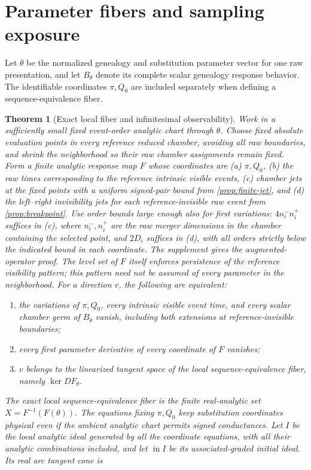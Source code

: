 \documentclass[11pt]{article}
\newtheorem{theorem}{Theorem}[section]
\begin{document}
\section{Parameter fibers and sampling exposure}
\label{sec:fibers}

Let $\theta$ be the normalized genealogy and substitution parameter vector for one raw presentation, and let $B_\theta$ denote its complete scalar genealogy response behavior.  The identifiable coordinates $\pi,Q_0$ are included separately when defining a sequence-equivalence fiber.

\begin{theorem}[Exact local fiber and infinitesimal observability]
\label{thm:parameter-fiber}
Work in a sufficiently small fixed event-order analytic chart through $\theta$.  Choose fixed absolute evaluation points in every reference reduced chamber, avoiding all raw boundaries, and shrink the neighborhood so their raw chamber assignments remain fixed.  Form a finite analytic response map $F$ whose coordinates are (a) $\pi,Q_0$, (b) the raw times corresponding to the reference intrinsic visible events, (c) chamber jets at the fixed points with a uniform signed-pair bound from \cref{prop:finite-jet}, and (d) the left--right invisibility jets for each reference-invisible raw event from \cref{prop:breakpoint}.  Use order bounds large enough also for first variations: $4n_i^-n_i^+$ suffices in (c), where $n_i^-,n_i^+$ are the raw merger dimensions in the chamber containing the selected point, and $2D_i$ suffices in (d), with all orders strictly below the indicated bound in each coordinate.  The supplement gives the augmented-operator proof.  The level set of $F$ itself enforces persistence of the reference visibility pattern; this pattern need not be assumed of every parameter in the neighborhood.  For a direction $v$, the following are equivalent:
\begin{enumerate}[label=(\roman*)]
\item the variations of $\pi,Q_0$, every intrinsic visible event time, and every scalar chamber germ of $B_\theta$ vanish, including both extensions at reference-invisible boundaries;
\item every first parameter derivative of every coordinate of $F$ vanishes;
\item $v$ belongs to the linearized tangent space of the local sequence-equivalence fiber, namely $\ker DF_\theta$.
\end{enumerate}
The exact local sequence-equivalence fiber is the finite real-analytic set $X=F^{-1}(F(\theta))$.  The equations fixing $\pi,Q_0$ keep substitution coordinates physical even if the ambient analytic chart permits signed conductances.  Let $I$ be the local analytic ideal generated by all the coordinate equations, with all their analytic combinations included, and let $\operatorname{in}I$ be its associated-graded initial ideal.  Its real arc tangent cone is

\end{theorem}
\end{document}
